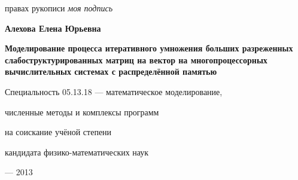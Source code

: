 \fontsize{14pt}{15pt}\selectfont  %
\thispagestyle{empty}

\vspace{10mm}
\begin{flushright}
   правах рукописи
  \textit{моя подпись}
\end{flushright}

\vspace{25mm}
\begin{center}
{\Large\bf Алехова Елена Юрьевна}
\end{center}

\vspace{25mm}
\begin{center}
{\bf \LARGE Моделирование процесса итеративного умножения больших разреженных
слабоструктурированных матриц на вектор на многопроцессорных вычислительных системах с распределённой памятью
\par}

\vspace{25mm}
{\Large
Специальность 05.13.18 --- математическое моделирование,\par
численные методы и комплексы программ
}

\vspace{15mm}
\par
{} на соискание учёной степени\par
кандидата физико-математических наук
\end{center}

\vspace{30mm}
\begin{center}
{ --- 2013}
\end{center}

\newpage

